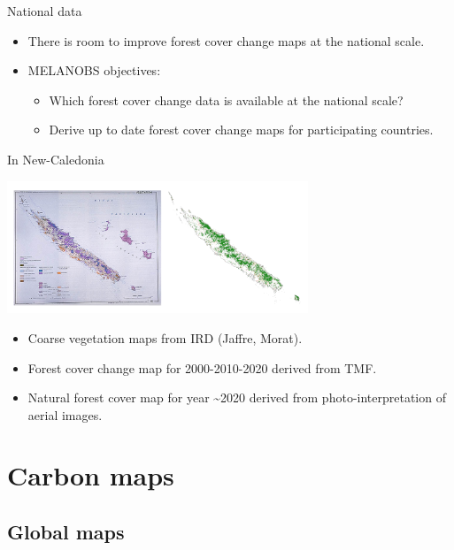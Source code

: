 \documentclass[10pt,table,dvipsnames,compress]{beamer}
\begin{document}
\begin{frame}[label={sec:orgf6f1989}]{National data}
\begin{itemize}
\item There is room to improve forest cover change maps at the national scale.

\item MELANOBS objectives:
\begin{itemize}
\item Which forest cover change data is available at the national scale?
\item Derive up to date forest cover change maps for participating countries.
\end{itemize}
\end{itemize}
\end{frame}

\begin{frame}[label={sec:orgee3ce1b}]{In New-Caledonia}
\begin{center}
\includegraphics[width=9cm]{figs/fcc/fcc_nc.png}
\end{center}

\begin{itemize}
\item Coarse vegetation maps from IRD (Jaffre, Morat).
\item Forest cover change map for 2000-2010-2020 derived from TMF.
\item Natural forest cover map for year \textasciitilde{}2020 derived from photo-interpretation of aerial images.
\end{itemize}
\end{frame}

\section{Carbon maps}
\label{sec:org9356111}

\subsection{Global maps}
\label{sec:orga972b40}
\end{document}

